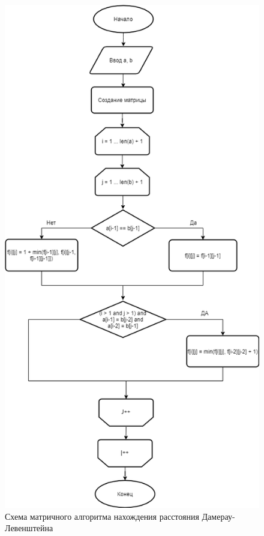 \documentclass[a4paper, 12pt]{article}
\begin{document}
\begin{flushleft}
\begin{figure}[h]
		\centering \includegraphics[scale=1.7]{damlevtable}
		\centering \caption{Схема матричного алгоритма нахождения расстояния Дамерау-Левенштейна}
	\end{figure}
    \clearpage

\end{flushleft}
\end{document}

